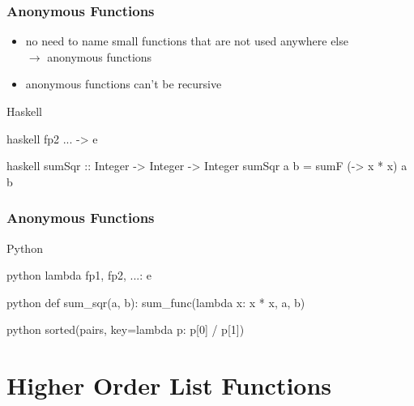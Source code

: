 \documentclass[dvipsnames]{beamer}
\theoremstyle{plain}
\begin{document}
\begin{frame}[fragile]
  \frametitle{Anonymous Functions}

  \begin{itemize}
    \item no need to name small functions that are not used anywhere else\\
      $\rightarrow$ \alert{anonymous functions}
    \item anonymous functions can't be recursive
  \end{itemize}

  \pause
  \begin{block}{Haskell}
    \begin{pygments}{haskell}
       fp2 ... -> e
    \end{pygments}
  \end{block}

  \medskip
  \begin{example}{}
    \begin{pygments}{haskell}
sumSqr :: Integer -> Integer -> Integer
sumSqr a b = sumF (\x -> x * x) a b
    \end{pygments}
  \end{example}
\end{frame}

\begin{frame}[fragile]
  \frametitle{Anonymous Functions}

  \begin{block}{Python}
    \begin{pygments}{python}
      lambda fp1, fp2, ...: e
    \end{pygments}
  \end{block}

  \medskip
  \begin{example}{}
    \begin{pygments}{python}
def sum_sqr(a, b):
    sum_func(lambda x: x * x, a, b)
    \end{pygments}

    \pause
    \bigskip
    \begin{pygments}{python}
sorted(pairs, key=lambda p: p[0] / p[1])
    \end{pygments}
  \end{example}
\end{frame}

\section{Higher Order List Functions}
\end{document}
